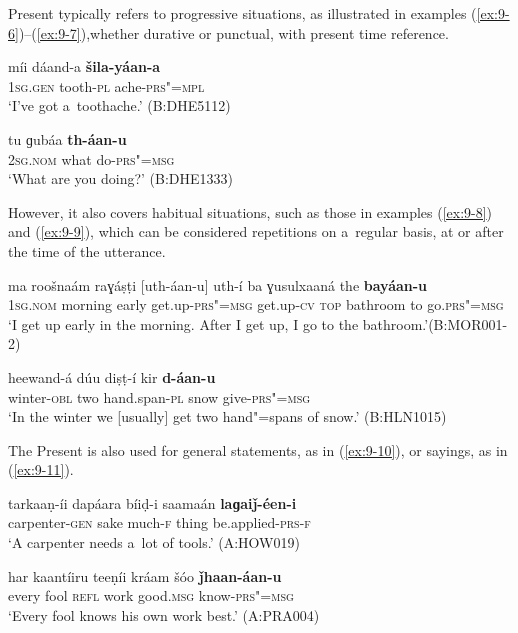 Present typically refers to progressive situations, as illustrated in examples (\ref{ex:9-6})--(\ref{ex:9-7}),whether durative or punctual, with present time reference.

\begin{exe}
\ex
\label{ex:9-6}
\gll míi dáand-a \textbf{šila-yáan-a} \\
\textsc{1sg.gen} tooth-\textsc{pl} ache-\textsc{prs"=mpl} \\
\glt `I've got a~toothache.' (B:DHE5112)

\ex
\label{ex:9-7}
\gll tu ɡubáa \textbf{th-áan-u} \\
\textsc{2sg.nom} what do-\textsc{prs"=msg} \\
\glt `What are you doing?' (B:DHE1333)
\end{exe}

However, it also covers habitual situations, such as those in examples (\ref{ex:9-8}) and (\ref{ex:9-9}), which can be considered repetitions on a~regular basis, at or after the time of the utterance. 

\begin{exe}
\ex
\label{ex:9-8}
\gll ma roošnaám raɣáṣṭi [uth-áan-u] uth-í ba ɣusulxaaná the \textbf{bayáan-u} \\
\textsc{1sg.nom} morning early get.up-\textsc{prs"=msg} get.up-\textsc{cv}  \textsc{top} bathroom to go.\textsc{prs"=msg} \\
\glt `I get up early in the morning. After I get up, I go to the bathroom.'\newline (B:MOR001-2)

\ex
\label{ex:9-9}
\gll heewand-á dúu diṣṭ-í kir \textbf{d-áan-u} \\
winter-\textsc{obl} two hand.span-\textsc{pl} snow give-\textsc{prs"=msg} \\
\glt `In the winter we [usually] get two hand"=spans of snow.' (B:HLN1015)
\end{exe}

The Present is also used for general statements, as in (\ref{ex:9-10}), or sayings, as in (\ref{ex:9-11}).

\begin{exe}
\ex
\label{ex:9-10}
\gll tarkaaṇ-íi dapáara bíiḍ-i saamaán \textbf{laɡaiǰ-éen-i}  \\
carpenter-\textsc{gen} sake much-\textsc{f} thing be.applied-\textsc{prs-f} \\
\glt `A carpenter needs a~lot of tools.' (A:HOW019)

\ex
\label{ex:9-11}
\gll har kaantíiru teeṇíi kráam šóo \textbf{ǰhaan-áan-u} \\
every fool \textsc{refl} work good.\textsc{msg} know-\textsc{prs"=msg} \\
\glt `Every fool knows his own work best.' (A:PRA004)
\end{exe}

